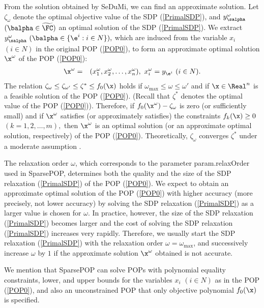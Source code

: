 From the solution obtained by SeDuMi, we can find an approximate solution.
Let 
$\zeta_{\omega}$ denote the optimal objective value of the SDP (\ref{PrimalSDP}), and 
$y_{\salpha}^{\omega}$ $(\balpha \in \widetilde{\FC})$ an optimal solution of the SDP (\ref{PrimalSDP}). 
We extract 
$ 
y_{\salpha}^{\omega} \ (\balpha \in \{ \e^{i} : i \in N\} ), 
$ 
which are induced from 
the variable $x_i$ $(i \in N)$ in the original POP (\ref{POP0}), to form 
an approximate optimal solution $\x^{\omega}$ of the POP (\ref{POP0}): 
\begin{eqnarray*}
\x^{\omega} & = & (x_1^{\omega},x_2^{\omega},\ldots,x_n^{\omega}), \ 
x_{i}^{\omega}  = y_{\e^i} \ (i \in N). 
\end{eqnarray*}
The relation $\zeta_{\omega} \leq \zeta_{\omega'} \leq \zeta^* \leq f_0(\x)$ holds if 
$\omega_{\max} \leq \omega \leq \omega'$ and if $\x \in \Real^n$ is a feasible solution 
of the POP (\ref{POP0}). (Recall that $\zeta^*$ denotes the optimal value of the POP 
(\ref{POP0})). Therefore, if $f_0(\x^{\omega})-\zeta_{\omega}$ is zero (or sufficiently small) 
and if $\x^{\omega}$ satisfies (or approximately satisfies) the constraints 
$f_k(\x) \geq 0$ $(k=1,2,\ldots,m),$ then $\x^{\omega}$ is an optimal solution 
(or an approximate optimal solution, respectively) of the POP (\ref{POP0}).  
Theoretically, $\zeta_{\omega}$ converges $\zeta^*$ under a moderate assumption \cite{LAS06}.  

The relaxation order $\omega$,
which 
corresponds to the parameter {\sf param.relaxOrder} used in SparsePOP, 
determines both the quality and the size 
of the SDP relaxation (\ref{PrimalSDP}) of the POP (\ref{POP0}). 
We expect to obtain an approximate optimal solution of the POP (\ref{POP0})
with  higher accuracy (more precisely,  not lower accuracy) by solving  the SDP 
relaxation (\ref{PrimalSDP}) as  a larger  value is chosen for $\omega$. 
In practice, however, the size of  the SDP relaxation (\ref{PrimalSDP}) becomes larger and 
the cost of solving the SDP relaxation (\ref{PrimalSDP}) increases
very rapidly. 
Therefore, we usually start 
the SDP relaxation (\ref{PrimalSDP})  with the relaxation order 
$\omega=\omega_{\max}$, and successively increase $\omega$ by $1$ if 
the approximate 
solution $\x^{\omega}$ obtained is not accurate. 

We mention that SparsePOP can solve POPs with polynomial equality constraints, 
lower, and upper bounds for the variables $x_i$ $(i \in N)$ as in the 
POP (\ref{POP0}), and also an unconstrained POP that only objective 
polynomial $f_0 (\x)$ is specified. 



